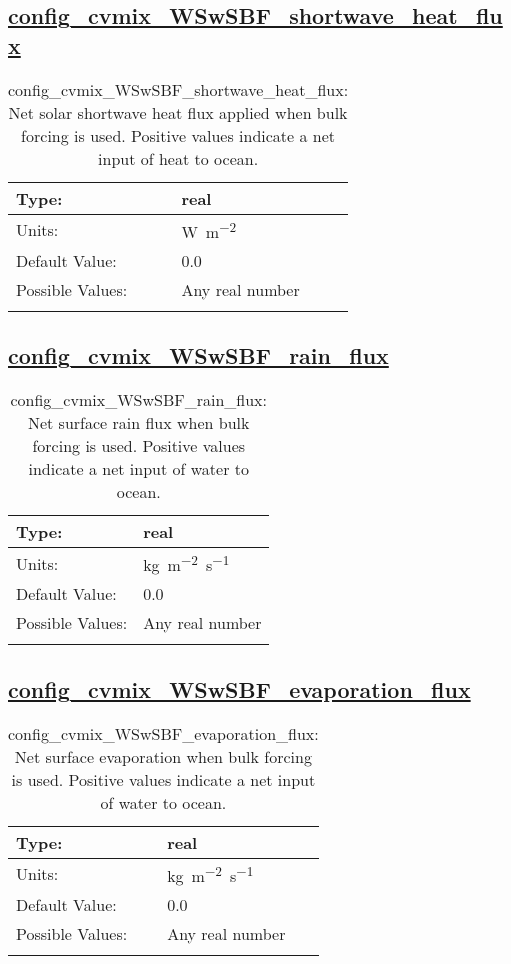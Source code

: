 \subsection[config\_cvmix\_WSwSBF\_shortwave\_heat\_flux]{\hyperref[sec:nm_tab_cvmix_WSwSBF]{config\_cvmix\_WSwSBF\_shortwave\_heat\_flux}}
\label{subsec:nm_sec_config_cvmix_WSwSBF_shortwave_heat_flux}
\begin{center}
\begin{longtable}{| p{2.0in} || p{4.0in} |}
    \hline
    Type: & real \\
    \hline
    Units: & \si{W.m^{-2}} \\
    \hline
    Default Value: & 0.0 \\
    \hline
    Possible Values: & Any real number \\
    \hline
    \caption{config\_cvmix\_WSwSBF\_shortwave\_heat\_flux: Net solar shortwave heat flux applied when bulk forcing is used. Positive values indicate a net input of heat to ocean.}
\end{longtable}
\end{center}
\subsection[config\_cvmix\_WSwSBF\_rain\_flux]{\hyperref[sec:nm_tab_cvmix_WSwSBF]{config\_cvmix\_WSwSBF\_rain\_flux}}
\label{subsec:nm_sec_config_cvmix_WSwSBF_rain_flux}
\begin{center}
\begin{longtable}{| p{2.0in} || p{4.0in} |}
    \hline
    Type: & real \\
    \hline
    Units: & \si{kg.m^{-2}.s^{-1}} \\
    \hline
    Default Value: & 0.0 \\
    \hline
    Possible Values: & Any real number \\
    \hline
    \caption{config\_cvmix\_WSwSBF\_rain\_flux: Net surface rain flux when bulk forcing is used. Positive values indicate a net input of water to ocean.}
\end{longtable}
\end{center}
\subsection[config\_cvmix\_WSwSBF\_evaporation\_flux]{\hyperref[sec:nm_tab_cvmix_WSwSBF]{config\_cvmix\_WSwSBF\_evaporation\_flux}}
\label{subsec:nm_sec_config_cvmix_WSwSBF_evaporation_flux}
\begin{center}
\begin{longtable}{| p{2.0in} || p{4.0in} |}
    \hline
    Type: & real \\
    \hline
    Units: & \si{kg.m^{-2}.s^{-1}} \\
    \hline
    Default Value: & 0.0 \\
    \hline
    Possible Values: & Any real number \\
    \hline
    \caption{config\_cvmix\_WSwSBF\_evaporation\_flux: Net surface evaporation when bulk forcing is used. Positive values indicate a net input of water to ocean.}
\end{longtable}
\end{center}

